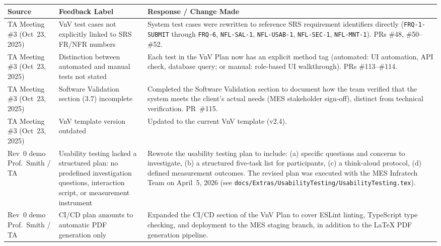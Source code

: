 \documentclass{article}
\begin{document}
\begin{longtable}{p{3.2cm} p{3.8cm} p{7.4cm}}
\toprule
\textbf{Source} & \textbf{Feedback Label} & \textbf{Response / Change Made} \\
\midrule
\endhead

TA Meeting \#3 (Oct~23, 2025)
  & VnV test cases not explicitly linked to SRS FR/NFR numbers
  & System test cases were rewritten to reference SRS requirement
    identifiers directly
    (\texttt{FRQ-1-SUBMIT} through \texttt{FRQ-6}, \texttt{NFL-SAL-1},
    \texttt{NFL-USAB-1}, \texttt{NFL-SEC-1}, \texttt{NFL-MNT-1}).
    PRs \#48, \#50--\#52.
\\[4pt]

TA Meeting \#3 (Oct~23, 2025)
  & Distinction between automated and manual tests not stated
  & Each test in the VnV Plan now has an explicit method tag
    (automated: UI automation, API check, database query; or
    manual: role-based UI walkthrough).
    PRs \#113--\#114.
\\[4pt]

TA Meeting \#3 (Oct~23, 2025)
  & Software Validation section (3.7) incomplete
  & Completed the Software Validation section to document how the team
    verified that the system meets the client's actual needs (MES
    stakeholder sign-off), distinct from technical verification.
    PR~\#115.
\\[4pt]

TA Meeting \#3 (Oct~23, 2025)
  & VnV template version outdated
  & Updated to the current VnV template (v2.4).
\\[4pt]

Rev~0 demo Prof.\ Smith / TA
  & Usability testing lacked a structured plan: no predefined
    investigation questions, interaction script, or measurement
    instrument
  & Rewrote the usability testing plan to include:
    (a) specific questions and concerns to investigate,
    (b) a structured five-task list for participants,
    (c) a think-aloud protocol,
    (d) defined measurement outcomes.
    The revised plan was executed with the MES Infratech Team on
    April~5, 2026 (see
    \texttt{docs/Extras/UsabilityTesting/UsabilityTesting.tex}).
\\[4pt]

Rev~0 demo Prof.\ Smith / TA
  & CI/CD plan amounts to automatic PDF generation only
  & Expanded the CI/CD section of the VnV Plan to cover ESLint linting,
    TypeScript type checking, and deployment to the MES staging branch,
    in addition to the LaTeX PDF generation pipeline.
\\[4pt]


\end{longtable}
\end{document}
